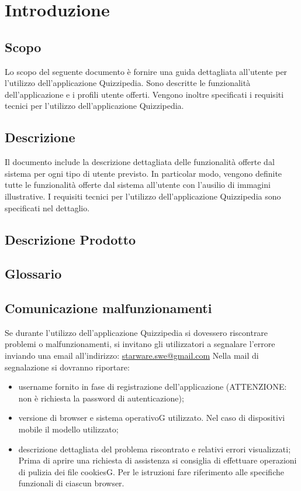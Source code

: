 \documentclass[12pt,a4paper]{article}
\begin{document}
	\newpage
	\tableofcontents
	\newpage
	\listoftables
	\listoffigures
	\newpage
	
	
	\section{Introduzione}	\label{intro}
	
	\subsection{Scopo}
	Lo scopo del seguente documento è fornire una guida dettagliata all’utente per l’utilizzo dell’applicazione Quizzipedia. Sono descritte le funzionalità dell'applicazione e i profili utente offerti.
	Vengono inoltre specificati i requisiti tecnici per l'utilizzo dell'applicazione Quizzipedia.

	\subsection{Descrizione}
    Il documento include la descrizione dettagliata delle funzionalità offerte dal sistema per ogni tipo di utente previsto. In particolar modo, vengono definite tutte le funzionalità offerte dal sistema all’utente con l’ausilio di immagini illustrative. 
    I requisiti tecnici per l'utilizzo dell'applicazione Quizzipedia sono specificati nel dettaglio.
	
	\subsection{Descrizione Prodotto}
	\descrizioneProdotto
	
	\subsection{Glossario}
	\glossarioPrint
		\subsection{Comunicazione malfunzionamenti}
		Se durante l’utilizzo dell’applicazione Quizzipedia si dovessero riscontrare problemi o
		malfunzionamenti, si invitano gli utilizzatori a segnalare l’errore inviando una email
		all’indirizzo:
		\url{starware.swe@gmail.com}
		Nella mail di segnalazione si dovranno riportare:
		\begin{itemize}
			\item username fornito in fase di registrazione dell’applicazione (ATTENZIONE:
			non è richiesta la password di autenticazione);
			\item versione di browser e sistema operativoG utilizzato. Nel caso di dispositivi
			mobile il modello utilizzato;
			\item descrizione dettagliata del problema riscontrato e relativi errori visualizzati;
			Prima di aprire una richiesta di assistenza si consiglia di effettuare operazioni di
			pulizia dei file cookiesG. Per le istruzioni fare riferimento alle specifiche funzionali di
			ciascun browser.
		\end{itemize}
\end{document}
